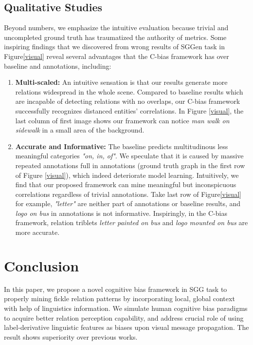\documentclass[runningheads]{llncs}
\begin{document}
\subsection{Qualitative Studies}
\label{qual}
Beyond numbers, we emphasize the intuitive evaluation because trivial and
uncompleted ground truth has traumatized the authority of metrics.    Some
inspiring findings that we discovered from wrong results of SGGen task in
Figure\ref{visual} reveal several advantages that the C-bias framework has over
baseline and annotations, including:

\begin{enumerate}
  \item \textbf{Multi-scaled:} An intuitive sensation is that our results
        generate more relations widespread in the whole scene. Compared to baseline
        results which are incapable of detecting relations with no overlaps, our C-bias
        framework successfully recognizes distanced entities' correlations. In Figure
        \ref{visual}, the last column of first image shows our framework can notice
        \textit{man walk on sidewalk} in a small area of the background.

\item \textbf{Accurate and Informative:} The baseline predicts
        multitudinous less meaningful categories \textit{"on, in, of"}. We speculate
        that it is caused by massive repeated annotations full in annotations (ground
        truth graph in the first row of Figure \ref{visual}), which indeed deteriorate
        model learning. Intuitively, we find that our proposed framework can mine
        meaningful but inconspicuous correlations regardless of trivial annotations.
        Take last row of Figure\ref{visual} for example, \textit{"letter"} are neither
        part of annotations or baseline results, and  \textit{logo on bus} in
        annotations is not informative. Inspiringly, in the C-bias framework, relation
        triblets  \textit{letter painted on bus} and  \textit{logo mounted on
          bus} are more accurate.
\end{enumerate}

\section{Conclusion}
In this paper, we propose a novel cognitive bias framework   in SGG task to
properly mining fickle relation patterns by incorporating local, global context
with help of linguistics information. We simulate human cognitive bias
paradigms to acquire better relation perception capability, and address crucial
role of using label-derivative linguistic features as biases upon visual
message propagation. The result shows superiority over previous works.

\clearpage


\end{document}
